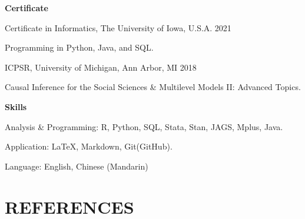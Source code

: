 \documentclass[10.5pt,]{article}
\providecommand{\tightlist}{%
	\setlength{\itemsep}{0pt}\setlength{\parskip}{0pt}}
\renewenvironment{itemize}{
	\begin{list}{}{
			\setlength{\leftmargin}{1.5em}
		}
	}{
	\end{list}
}
\begin{document}
\begin{itemize}
\tightlist
\item
  \textbf{Certificate}

  \begin{itemize}
  \tightlist
  \item
    Certificate in Informatics, The University of Iowa, U.S.A.
    \hfill 2021

    \begin{itemize}
    \tightlist
    \item
      Programming in Python, Java, and SQL.
    \end{itemize}
  \item
    ICPSR, University of Michigan, Ann Arbor, MI \hfill 2018

    \begin{itemize}
    \tightlist
    \item
      Causal Inference for the Social Sciences \& Multilevel Models II:
      Advanced Topics.
    \end{itemize}
  \end{itemize}
\item
  \textbf{Skills}

  \begin{itemize}
  \tightlist
  \item
    Analysis \& Programming: R, Python, SQL, Stata, Stan, JAGS, Mplus,
    Java.
  \item
    Application: LaTeX, Markdown, Git(GitHub).
  \item
    Language: English, Chinese (Mandarin)
  \end{itemize}
\end{itemize}

\section{REFERENCES}\label{references}
\end{document}
